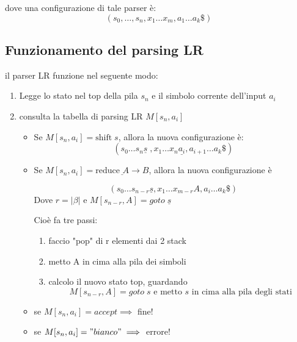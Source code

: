 dove una configurazione di tale parser è:
\[
    (s_0, \dots, s_n, x_1 \dots x_m, a_1 \dots a_k \$)
\]

\subsection{Funzionamento del parsing LR}
il parser LR funzione nel seguente modo:
\begin{enumerate}
    \item Legge lo stato nel top della pila $s_n$ e il simbolo corrente dell'input $a_i$
    \item consulta la tabella di parsing LR $M[s_n, a_i]$
    \begin{itemize}
        \item Se $M[s_n, a_i] = \text{shift}\; s$, allora la nuova configurazione è:
        \[
            (s_0\dots s_n \underline{s}\;, x_1 \dots x_n \underline{a_i}, a_{i+1} \dots a_k \$)
        \]
        \item Se $M[s_n, a_i]= \underline{\text{reduce } A\to B}$, allora la nuova configurazione è
        
        \[
            (s_0 \dots s_{n-r} \underline{s}, x_1 \dots x_{m-r}A, a_i\dots a_k \$)
        \]
        Dove $r=|\beta|$ e $M[s_{n-r}, A]=goto \; \underline{s}$

        Cioè fa tre passi:
        \begin{enumerate}
            \item faccio "pop" di r elementi dai 2 stack
            \item metto A in cima alla pila dei simboli
            \item calcolo il nuovo stato top, guardando 
            \[
                M[s_{n-r}, A] = goto\; s \text{ e metto }s\text{ in cima alla pila degli stati}
            \]
        \end{enumerate}
        \item se $M[s_n, a_i] = accept \implies$ fine!
        \item se $M[s_n, a_i] = "bianco" \implies$ errore!
    \end{itemize}
\end{enumerate}
